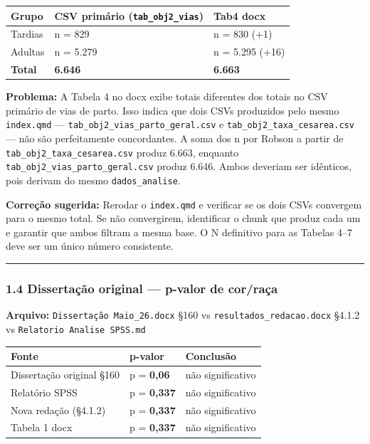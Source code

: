 \documentclass[
]{article}
\begin{document}
\begin{longtable}[]{@{}lll@{}}
\toprule
Grupo & CSV primário (\texttt{tab\_obj2\_vias}) & Tab4
docx\tabularnewline
\midrule
\endhead
Tardias & n = 829 & n = 830 (+1)\tabularnewline
Adultas & n = 5.279 & n = 5.295 (+16)\tabularnewline
\textbf{Total} & \textbf{6.646} & \textbf{6.663}\tabularnewline
\bottomrule
\end{longtable}

\textbf{Problema:} A Tabela 4 no docx exibe totais diferentes dos totais
no CSV primário de vias de parto. Isso indica que dois CSVs produzidos
pelo mesmo \texttt{index.qmd} ---
\texttt{tab\_obj2\_vias\_parto\_geral.csv} e
\texttt{tab\_obj2\_taxa\_cesarea.csv} --- não são perfeitamente
concordantes. A soma dos n por Robson a partir de
\texttt{tab\_obj2\_taxa\_cesarea.csv} produz 6.663, enquanto
\texttt{tab\_obj2\_vias\_parto\_geral.csv} produz 6.646. Ambos deveriam
ser idênticos, pois derivam do mesmo \texttt{dados\_analise}.

\textbf{Correção sugerida:} Rerodar o \texttt{index.qmd} e verificar se
os dois CSVs convergem para o mesmo total. Se não convergirem,
identificar o chunk que produz cada um e garantir que ambos filtram a
mesma base. O N definitivo para as Tabelas 4--7 deve ser um único número
consistente.

\begin{center}\rule{0.5\linewidth}{0.5pt}\end{center}

\hypertarget{dissertauxe7uxe3o-original-p-valor-de-corrauxe7a}{%
\subsubsection{1.4 Dissertação original --- p-valor de
cor/raça}\label{dissertauxe7uxe3o-original-p-valor-de-corrauxe7a}}

\textbf{Arquivo:} \texttt{Dissertação\ Maio\_26.docx} §160 vs
\texttt{resultados\_redacao.docx} §4.1.2 vs
\texttt{Relatorio\ Analise\ SPSS.md}

\begin{longtable}[]{@{}lll@{}}
\toprule
Fonte & p-valor & Conclusão\tabularnewline
\midrule
\endhead
Dissertação original §160 & p = \textbf{0,06} & não
significativo\tabularnewline
Relatório SPSS & p = \textbf{0,337} & não significativo\tabularnewline
Nova redação (§4.1.2) & p = \textbf{0,337} & não
significativo\tabularnewline
Tabela 1 docx & p = \textbf{0,337} & não significativo\tabularnewline
\bottomrule
\end{longtable}
\end{document}
